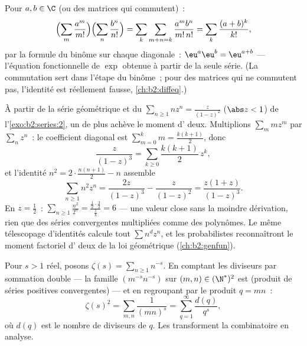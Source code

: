 \begin{example}\label{ex:b2:series:exp}
Pour $a, b \in \C$ (ou des matrices qui commutent)~:
\[
\Bigl(\sum_m \frac{a^m}{m!}\Bigr)\Bigl(\sum_n
\frac{b^n}{n!}\Bigr)
= \sum_k \sum_{m+n=k} \frac{a^m b^n}{m!\,n!}
= \sum_k \frac{(a + b)^k}{k!},
\]
par la formule du binôme sur chaque diagonale~: $\eu^a \eu^b =
\eu^{a+b}$ --- l'équation fonctionnelle de $\exp$ obtenue à partir de
la seule série. (La commutation sert dans l'étape du binôme~; pour
des matrices qui ne commutent pas, l'identité est réellement fausse,
\cref{ch:b2:diffeq}.)
\end{example}

\begin{example}\label{ex:b2:series:squaresum}
À partir de la série géométrique et du $\sum_{n \geq 1} nz^n =
\frac{z}{(1-z)^2}$ ($\abs z < 1$) de l'\cref{exo:b2:series:2}, un
 de plus achève le moment d' deux. Multiplions
$\sum_m mz^m$ par $\sum_n z^n$~: le coefficient diagonal est
$\sum_{m=0}^k m = \frac{k(k+1)}2$, donc
\[
\frac{z}{(1-z)^3} = \sum_{k\geq0}\frac{k(k+1)}{2}\,z^k ,
\]
et l'identité $n^2 = 2\cdot\frac{n(n+1)}2 - n$ assemble
\[
\sum_{n\geq1} n^2z^n = \frac{2z}{(1-z)^3} - \frac{z}{(1-z)^2}
= \frac{z(1+z)}{(1-z)^3} .
\]
En $z = \frac12$~: $\sum_{n\geq1}\frac{n^2}{2^n} =
\frac{\frac12\cdot\frac32}{\frac18} = 6$ --- une valeur close sans la
moindre dérivation, rien que des séries  convergentes
multipliées comme des polynômes. Le même télescopage d'identités
calcule tout $\sum n^dz^n$, et les probabilistes reconnaîtront le
moment factoriel d' deux de la loi géométrique
(\cref{ch:b2:genfun}).
\end{example}

\begin{example}\label{ex:b2:series:doublesum}
Pour $s > 1$ réel, posons $\zeta(s) = \sum_{n\geq1} n^{-s}$. En
comptant les diviseurs par sommation double --- la famille
$(m^{-s}n^{-s})$ sur $(m,n) \in (\N^*)^2$ est  (produit de
séries positives convergentes) --- et en regroupant par le produit
$q = mn$~:
\[
\zeta(s)^2 = \sum_{m,n} \frac{1}{(mn)^s}
= \sum_{q=1}^{\infty} \frac{d(q)}{q^s},
\]
où $d(q)$ est le nombre de diviseurs de $q$. Les 
transforment la combinatoire en analyse.
\end{example}

